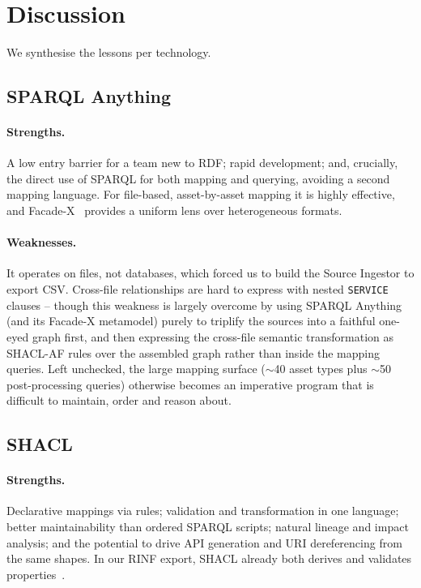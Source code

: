 \documentclass{ceurart}
\begin{document}
\section{Discussion}
\label{sec:discussion}

We synthesise the lessons per technology.

\subsection{SPARQL Anything}

\paragraph{Strengths.} A low entry barrier for a team new to RDF; rapid
development; and, crucially, the direct use of SPARQL for both mapping and
querying, avoiding a second mapping language. For file-based, asset-by-asset
mapping it is highly effective, and Facade-X~\cite{facadex} provides a uniform
lens over heterogeneous formats.

\paragraph{Weaknesses.} It operates on files, not databases, which forced us to
build the Source Ingestor to export CSV. Cross-file relationships are hard to
express with nested \texttt{SERVICE} clauses -- though this weakness is largely
overcome by using SPARQL Anything (and its Facade-X metamodel) purely to
triplify the sources into a faithful one-eyed graph first, and then expressing
the cross-file semantic transformation as SHACL-AF rules over the assembled
graph rather than inside the mapping queries. Left unchecked, the large mapping
surface ($\sim$40 asset types plus $\sim$50 post-processing queries) otherwise
becomes an imperative program that is difficult to maintain, order and reason
about.

\subsection{SHACL}

\paragraph{Strengths.} Declarative mappings via rules; validation and
transformation in one language; better maintainability than ordered SPARQL
scripts; natural lineage and impact analysis; and the potential to drive API
generation and URI dereferencing from the same shapes. In our RINF export, SHACL
already both derives and validates properties~\cite{dim}.
\end{document}
